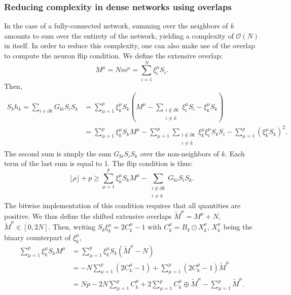 \subsubsection{Reducing complexity in dense networks using overlaps}
\myindent In the case of a fully-connected network, summing over the neighbors of $k$ amounts to sum over the entirety of the network, yielding a complexity of $\mathcal{O}(N)$ in itself. In order to reduce this complexity, one can also make use of the overlap to compute the neuron flip condition. We define the extensive overlap:
\begin{equation}
    M^\mu= N m^\mu = \sum_{i=1}^N \xi_i^\mu S_i.
    \label{eq:extensive_overlaps}
\end{equation}
Then,
\begin{align*}
    S_kh_k =
    \sum_{i \in \partial k} G_{ki} S_i S_k &= \sum_{\mu=1}^p \xi_k^\mu  S_k \left(M^\mu - \sum_{\substack{i \notin \partial k \\ i \neq k}}\xi_i^\mu S_i - \xi_k^\mu S_k \right)\\
    &= \sum_{\mu=1}^p \xi_k^\mu S_k M^\mu -  \sum_{\mu=1}^p \sum_{\substack{i \notin \partial k \\ i \neq k}} \xi_k^\mu \xi_i^\mu S_k S_i - \sum_{\mu=1}^p \left(\xi_k^\mu S_k \right) ^2.
\end{align*}
The second sum is simply the sum $G_{ki} S_i S_k$ over the non-neighbors of $k$. Each term of the last sum is equal to 1. The flip condition is thus:
\begin{equation}
  \lfloor \rho \rfloor +p  \geq \sum_{\mu=1}^p \xi_k^\mu S_k M^\mu - \sum_{\substack{i \notin \partial k \\ i \neq k}} G_{ki} S_i S_k.
\end{equation}
The bitwise implementation of this condition requires that all quantities are positive. We thus define the shifted extensive overlaps $ \tilde{M}^\mu = M^\mu + N$, $\tilde{M}^\mu \in[0, 2N]$. Then, writing $S_k \xi_k^\mu = 2 C_k^\mu -1$ with $C_k^\mu = B_k \odot X_k^\mu$, $X_k^\mu $ being the binary counterpart of $\xi_k^\mu$,
\begin{align*}
    \sum_{\mu=1}^p \xi_k^\mu S_k M^\mu &= \sum_{\mu=1}^p \xi_k^\mu S_k (\tilde{M}^\mu - N)\\
    &= - N \sum_{\mu=1}^p \left(2C_k^\mu - 1 \right) + \sum_{\mu=1}^p \left(2 C_k^\mu-1\right) \tilde{M}^\mu\\
    &= Np - 2N \sum_{\mu=1}^p C_k^\mu + 2 \sum_{\mu=1}^p C_k^\mu \oplus \tilde{M}^\mu- \sum_{\mu=1}^p \tilde{M}^\mu.
\end{align*}

